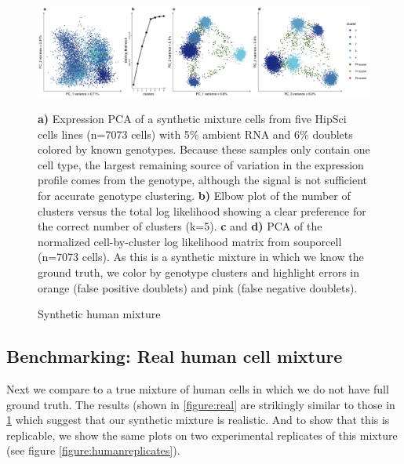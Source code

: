 \begin{figure}[th!]
\caption{Synthetic human mixture}
\label{figure:synthetic}
\begin{centering}

\includegraphics[width=\textwidth]{simulated.jpg} 
\par{\textbf{a)} Expression PCA of a synthetic mixture cells from five HipSci cells lines (n=7073 cells) with 5\% ambient RNA and 6\% doublets colored by known genotypes. Because these samples only contain one cell type, the largest remaining source of variation in the expression profile comes from the genotype, although the signal is not sufficient for accurate genotype clustering. \textbf{b)} Elbow plot of the number of clusters versus the total log likelihood showing a clear preference for the correct number of clusters (k=5). \textbf{c} and \textbf{d)} PCA of the normalized cell-by-cluster log likelihood matrix from souporcell (n=7073 cells). As this is a synthetic mixture in which we know the ground truth, we color by genotype clusters and highlight errors in orange (false positive doublets) and pink (false negative doublets).}

\end{centering}
\end{figure}





\subsection{Benchmarking: Real human cell mixture}

Next we compare to a true mixture of human cells in which we do not have full ground truth. The results (shown in \ref{figure:real} are strikingly similar to those in \ref{figure:synthetic} which suggest that our synthetic mixture is realistic. And to show that this is replicable, we show the same plots on two experimental replicates of this mixture (see figure \ref{figure:humanreplicates}).

